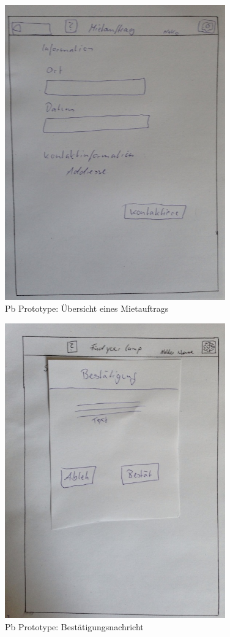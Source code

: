 \begin{figure}[H]
\centering
\includegraphics[angle=90, width=0.85\textwidth]{./images/paperbased/auftrag.JPG}
\caption{Pb Prototype: Übersicht eines Mietauftrags}
\label{pbprototype5}
\end{figure}

\begin{figure}[H]
\centering
\includegraphics[angle=90, width=0.85\textwidth]{./images/paperbased/bestaetigung.JPG}
\caption{Pb Prototype: Bestätigungsnachricht}
\label{pbprototype6}
\end{figure}

